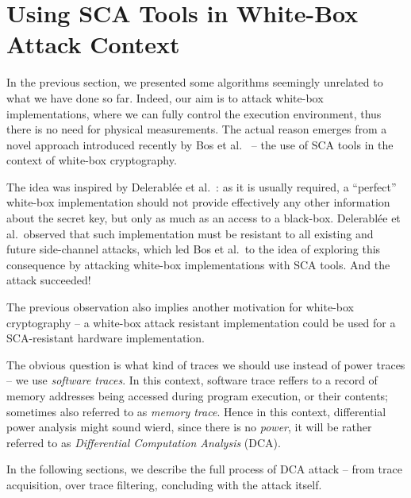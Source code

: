 \section{Using SCA Tools in White-Box Attack Context}
\label{sec:scawbc}

In the previous section, we presented some algorithms seemingly unrelated to what we have done so far. Indeed, our aim is to attack white-box implementations, where we can fully control the execution environment, thus there is no need for physical measurements. The actual reason emerges from a novel approach introduced recently by Bos et al.\ \cite{bos2015differential} -- the use of SCA tools in the context of white-box cryptography.

The idea was inspired by Delerabl{\'e}e et al.\ \cite{delerablee2013white}: as it is usually required, a ``perfect'' white-box implementation should not provide effectively any other information about the secret key, but only as much as an access to a black-box. Delerabl{\'e}e et al.\ observed that such implementation must be resistant to all existing and future side-channel attacks, which led Bos et al.\ to the idea of exploring this consequence by attacking white-box implementations with SCA tools. And the attack succeeded!

\begin{note}
\label{note:motiv}
	The previous observation also implies another motivation for white-box cryptography -- a white-box attack resistant implementation could be used for a SCA-resistant hardware implementation.
\end{note}

The obvious question is what kind of traces we should use instead of power traces -- we use {\em software traces}. In this context, software trace reffers to a record of memory addresses being accessed during program execution, or their contents; sometimes also referred to as {\em memory trace}. Hence in this context, differential power analysis might sound wierd, since there is no {\em power}, it will be rather referred to as {\em Differential Computation Analysis} (DCA).

In the following sections, we describe the full process of DCA attack -- from trace acquisition, over trace filtering, concluding with the attack itself.



